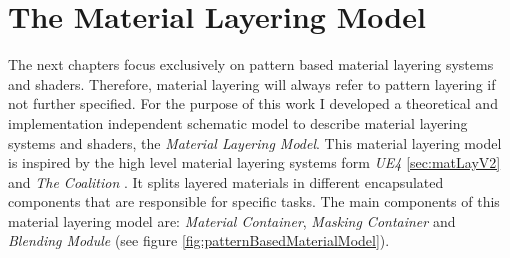 \chapter{The Material Layering Model}\label{cha:partsOfLayeredShader}

The next chapters focus exclusively on pattern based material layering systems and shaders. Therefore, material layering will always refer to pattern layering if not further specified. For the purpose of this work I developed a theoretical and implementation independent schematic model to describe material layering systems and shaders, the \emph{Material Layering Model}. This material layering model is inspired by the high level material layering systems form \emph{UE4} \ref{sec:matLayV2} and \emph{The Coalition} \cite{colin2017GearsOfWar}. It splits layered materials in different encapsulated components that are responsible for specific tasks. The main components of this material layering model are: \emph{Material Container}, \emph{Masking Container} and \emph{Blending Module} (see figure \ref{fig:patternBasedMaterialModel}). 

